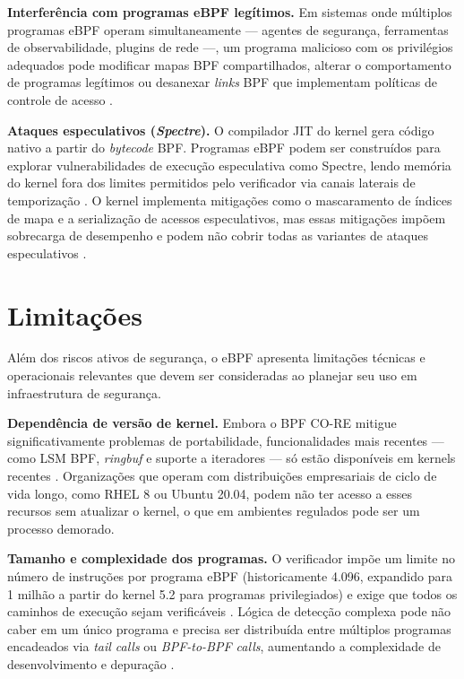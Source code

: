 \textbf{Interferência com programas eBPF legítimos.}
Em sistemas onde múltiplos programas eBPF operam simultaneamente — agentes de
segurança, ferramentas de observabilidade, plugins de rede —, um programa
malicioso com os privilégios adequados pode modificar mapas BPF compartilhados,
alterar o comportamento de programas legítimos ou desanexar \textit{links} BPF
que implementam políticas de controle de acesso \cite{linuxkernel2024}.

\textbf{Ataques especulativos (\textit{Spectre}).}
O compilador JIT do kernel gera código nativo a partir do \textit{bytecode} BPF.
Programas eBPF podem ser construídos para explorar vulnerabilidades de execução
especulativa como Spectre, lendo memória do kernel fora dos limites permitidos
pelo verificador via canais laterais de temporização \cite{linuxkernel2024}.
O kernel implementa mitigações como o mascaramento de índices de mapa e a
serialização de acessos especulativos, mas essas mitigações impõem sobrecarga
de desempenho e podem não cobrir todas as variantes de ataques especulativos
\cite{gregg2020}.

\section{Limitações}

Além dos riscos ativos de segurança, o eBPF apresenta limitações técnicas e
operacionais relevantes que devem ser consideradas ao planejar seu uso em
infraestrutura de segurança.

\textbf{Dependência de versão de kernel.}
Embora o BPF CO-RE \cite{nakryiko2020} mitigue significativamente problemas de
portabilidade, funcionalidades mais recentes — como LSM BPF, \textit{ringbuf} e
suporte a iteradores — só estão disponíveis em kernels recentes \cite{linuxkernel2024}.
Organizações que operam com distribuições empresariais de ciclo de vida longo,
como RHEL 8 ou Ubuntu 20.04, podem não ter acesso a esses recursos sem atualizar
o kernel, o que em ambientes regulados pode ser um processo demorado.

\textbf{Tamanho e complexidade dos programas.}
O verificador impõe um limite no número de instruções por programa eBPF
(historicamente 4.096, expandido para 1 milhão a partir do kernel 5.2 para
programas privilegiados) e exige que todos os caminhos de execução sejam
verificáveis \cite{linuxkernel2024}.
Lógica de detecção complexa pode não caber em um único programa e precisa ser
distribuída entre múltiplos programas encadeados via \textit{tail calls} ou
\textit{BPF-to-BPF calls}, aumentando a complexidade de desenvolvimento e
depuração \cite{gregg2019}.

